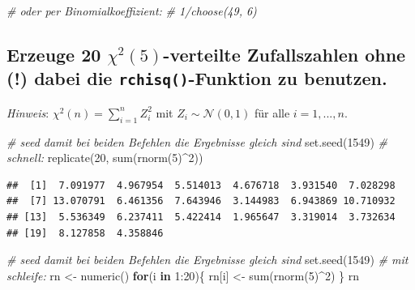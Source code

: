 \documentclass[12pt,a4paper]{article}
\newenvironment{Shaded}{\begin{snugshade}}{\end{snugshade}}
\newcommand{\CommentTok}[1]{\textcolor[rgb]{0.56,0.35,0.01}{\textit{#1}}}
\newcommand{\ControlFlowTok}[1]{\textcolor[rgb]{0.13,0.29,0.53}{\textbf{#1}}}
\newcommand{\DecValTok}[1]{\textcolor[rgb]{0.00,0.00,0.81}{#1}}
\newcommand{\FunctionTok}[1]{\textcolor[rgb]{0.00,0.00,0.00}{#1}}
\newcommand{\NormalTok}[1]{#1}
\newcommand{\OtherTok}[1]{\textcolor[rgb]{0.56,0.35,0.01}{#1}}
\newcommand{\SpecialCharTok}[1]{\textcolor[rgb]{0.00,0.00,0.00}{#1}}
\begin{document}
\begin{Shaded}
\begin{Highlighting}[]
    \CommentTok{\# oder per Binomialkoeffizient:}
    \CommentTok{\# 1/choose(49, 6)}
\end{Highlighting}
\end{Shaded}

\hypertarget{erzeuge-20-chi25-verteilte-zufallszahlen-ohne-dabei-die-rchisq-funktion-zu-benutzen.}{%
\subsection{\texorpdfstring{Erzeuge 20 \(\chi^2(5)\)-verteilte
Zufallszahlen ohne (!) dabei die \texttt{rchisq()}-Funktion zu
benutzen.}{Erzeuge 20 \textbackslash chi\^{}2(5)-verteilte Zufallszahlen ohne (!) dabei die rchisq()-Funktion zu benutzen.}}\label{erzeuge-20-chi25-verteilte-zufallszahlen-ohne-dabei-die-rchisq-funktion-zu-benutzen.}}

\emph{Hinweis}: \(\chi^2(n)=\sum_{i=1}^n Z_i^2\) mit
\(Z_i\sim\mathcal{N}(0,1)\) für alle \(i=1,...,n\).

\begin{Shaded}
\begin{Highlighting}[]
    \CommentTok{\# seed damit bei beiden Befehlen die Ergebnisse gleich sind}
    \FunctionTok{set.seed}\NormalTok{(}\DecValTok{1549}\NormalTok{) }
    \CommentTok{\# schnell: }
    \FunctionTok{replicate}\NormalTok{(}\DecValTok{20}\NormalTok{, }\FunctionTok{sum}\NormalTok{(}\FunctionTok{rnorm}\NormalTok{(}\DecValTok{5}\NormalTok{)}\SpecialCharTok{\^{}}\DecValTok{2}\NormalTok{))}
\end{Highlighting}
\end{Shaded}

\begin{verbatim}
##  [1]  7.091977  4.967954  5.514013  4.676718  3.931540  7.028298
##  [7] 13.070791  6.461356  7.643946  3.144983  6.943869 10.710932
## [13]  5.536349  6.237411  5.422414  1.965647  3.319014  3.732634
## [19]  8.127858  4.358846
\end{verbatim}

\begin{Shaded}
\begin{Highlighting}[]
    \CommentTok{\# seed damit bei beiden Befehlen die Ergebnisse gleich sind}
    \FunctionTok{set.seed}\NormalTok{(}\DecValTok{1549}\NormalTok{)}
    \CommentTok{\# mit schleife:}
\NormalTok{    rn }\OtherTok{\textless{}{-}} \FunctionTok{numeric}\NormalTok{()}
    \ControlFlowTok{for}\NormalTok{(i }\ControlFlowTok{in} \DecValTok{1}\SpecialCharTok{:}\DecValTok{20}\NormalTok{)\{}
\NormalTok{      rn[i] }\OtherTok{\textless{}{-}} \FunctionTok{sum}\NormalTok{(}\FunctionTok{rnorm}\NormalTok{(}\DecValTok{5}\NormalTok{)}\SpecialCharTok{\^{}}\DecValTok{2}\NormalTok{)}
\NormalTok{    \}}
\NormalTok{    rn}
\end{Highlighting}
\end{Shaded}
\end{document}
